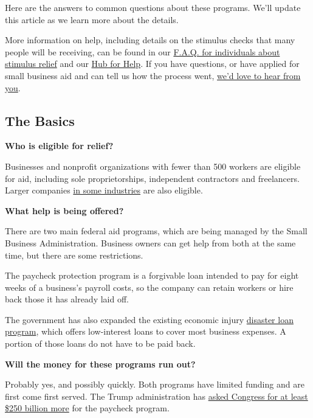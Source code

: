Here are the answers to common questions about these programs. We'll
update this article as we learn more about the details.

More information on help, including details on the stimulus checks that
many people will be receiving, can be found in our
\href{https://www.nytimes3xbfgragh.onion/article/coronavirus-stimulus-package-questions-answers.html}{F.A.Q.
for individuals about stimulus relief} and our
\href{https://www.nytimes3xbfgragh.onion/article/coronavirus-money-unemployment.html}{Hub
for Help}. If you have questions, or have applied for small business aid
and can tell us how the process went,
\href{mailto:stacy.cowley@NYTimes.com}{we'd love to hear from you}.

\hypertarget{the-basics}{%
\subsection{The Basics}\label{the-basics}}

\textbf{Who is eligible for relief?}

Businesses and nonprofit organizations with fewer than 500 workers are
eligible for aid, including sole proprietorships, independent
contractors and freelancers. Larger companies
\href{https://www.sba.gov/document/support--table-size-standards}{in
some industries} are also eligible.

\textbf{What help is being offered?}

There are two main federal aid programs, which are being managed by the
Small Business Administration. Business owners can get help from both at
the same time, but there are some restrictions.

The paycheck protection program is a forgivable loan intended to pay for
eight weeks of a business's payroll costs, so the company can retain
workers or hire back those it has already laid off.

The government has also expanded the existing economic injury
\href{https://www.nytimes3xbfgragh.onion/2020/08/03/business/small-business-loans-coronavirus.html}{disaster
loan program}, which offers low-interest loans to cover most business
expenses. A portion of those loans do not have to be paid back.

\textbf{Will the money for these programs run out?}

Probably yes, and possibly quickly. Both programs have limited funding
and are first come first served. The Trump administration has
\href{https://www.nytimes3xbfgragh.onion/2020/04/09/us/politics/congress-coronavirus-small-businesses.html}{asked
Congress for at least \$250 billion more} for the paycheck program.

